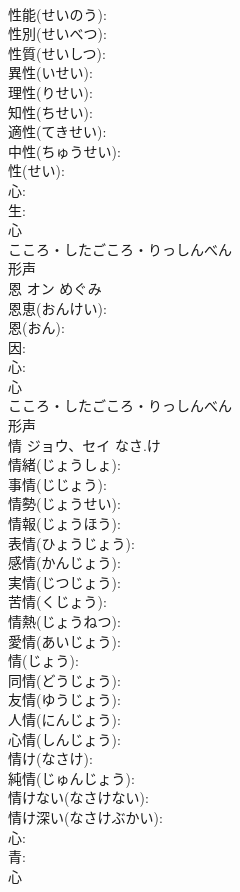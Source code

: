 \documentclass[8pt]{extreport}
\begin{document}
\begin{CJK}{UTF8}{min}
\\	性能(せいのう): 
\\	性別(せいべつ): 
\\	性質(せいしつ): 
\\	異性(いせい): 
\\	理性(りせい): 
\\	知性(ちせい): 
\\	適性(てきせい): 
\\	中性(ちゅうせい): 
\\	性(せい): 
\\	心: 
\\	生: 
\\	心	
\\	こころ・したごころ・りっしんべん	
\\	形声 
\\	恩	オン		めぐみ	
\\	恩恵(おんけい): 
\\	恩(おん): 
\\	因: 
\\	心: 
\\	心	
\\	こころ・したごころ・りっしんべん	
\\	形声 
\\	情	ジョウ、セイ	なさ.け		
\\	情緒(じょうしょ): 
\\	事情(じじょう): 
\\	情勢(じょうせい): 
\\	情報(じょうほう): 
\\	表情(ひょうじょう): 
\\	感情(かんじょう): 
\\	実情(じつじょう): 
\\	苦情(くじょう): 
\\	情熱(じょうねつ): 
\\	愛情(あいじょう): 
\\	情(じょう): 
\\	同情(どうじょう): 
\\	友情(ゆうじょう): 
\\	人情(にんじょう): 
\\	心情(しんじょう): 
\\	情け(なさけ): 
\\	純情(じゅんじょう): 
\\	情けない(なさけない): 
\\	情け深い(なさけぶかい): 
\\	心: 
\\	青: 
\\	心	

\end{CJK}
\end{document}

